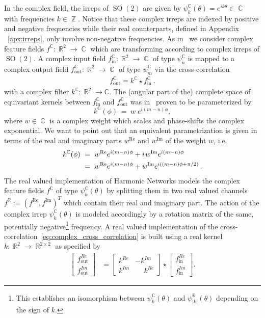 \documentclass{article}
\newcommand{\apx}{Appendix\xspace
}
\DeclareMathOperator*{\R}{\mathbb{R}}
\DeclareMathOperator*{\Cm}{\mathbb{C}}
\DeclareMathOperator*{\Z}{\mathbb{Z}}
\newcommand{\SO}[1]{\ensuremath{\operatorname{SO}(#1)}}
\begin{document}
In the complex field, the irreps of $\SO2$ are given by $\psi^{\Cm}_k(\theta) = e^{ik\theta}\in\Cm$ with frequencies $k\in\Z$.
Notice that these complex irreps are indexed by positive and negative frequencies while their real counterparts, defined in \apx~\ref{apx:irreps}, only involve non-negative frequencies.
As in~\cite{Worrall2017-HNET} we consider complex feature fields $f^\mathbb{C}:\R^2\to\Cm$ which are transforming according to complex irreps of $\SO2$.
A complex input  field $f^\mathbb{C}_\text{in}: \R^2\to\Cm$ of type $\psi^{\mathbb{C}}_n$ is mapped to
a complex output field $f^\mathbb{C}_\text{out}:\R^2\to\Cm$ of type $\psi^{\mathbb{C}}_m$
via the cross-correlation
\begin{align}\label{eq:complex_cross_correlation} 
    f^\mathbb{C}_\text{out} = k^\mathbb{C} \star f^\mathbb{C}_\text{in} \ .
\end{align}
with a complex filter $k^{\mathbb{C}}:\R^2\to\mathbb{C}$.
The (angular part of the) complete space of equivariant kernels between $f^\mathbb{C}_\text{in}$ and $f^\mathbb{C}_\text{out}$ was in~\cite{Worrall2017-HNET} proven to be parameterized by
\[
    k^{\mathbb{C}}(\phi)\ =\ w\; e^{i(m-n)\phi},
\]
where $w\in\Cm$ is a complex weight which scales and phase-shifts the complex exponential.
We want to point out that an equivalent parametrization is given in terms of the real and imaginary parts $w^\text{Re}$ and $w^\text{Im}$ of the weight $w$, i.e.
\begin{align}\label{eq:hnet_basis}
    k^{\mathbb{C}}(\phi)
    \ &=\ w^\text{Re}e^{i(m-n)\phi} + i\;\!w^\text{Im}e^{i (m-n)\phi} \notag \\
    \ &=\ w^\text{Re}e^{i(m-n)\phi} +      w^\text{Im}e^{i((m-n)\phi+\pi/2)}\,.
\end{align}
The real valued implementation of Harmonic Networks models the complex feature fields $f^{\Cm}$ of type $\psi^{\Cm}_k(\theta)$ by splitting them in two real valued channels $f^{\R}:=(f^\text{Re},f^\text{Im})^T$ which contain their real and imaginary part.
The action of the complex irrep $\psi^{\Cm}_k(\theta)$ is modeled accordingly by a rotation matrix of the same, potentially negative\footnote{This establishes an isomorphism between $\psi^{\Cm}_k(\theta)$ and $\psi^{\R}_{|k|}(\theta)$ depending on the sign of $k$.}
frequency.
A real valued implementation of the cross-correlation~\eqref{eq:complex_cross_correlation} is built using a real kernel $k:\R^2\to\R^{2\times2}$ as specified by
\begin{align*}
    \begin{bmatrix}
        f^{Re}_\text{out} \\
        f^{Im}_\text{out}
    \end{bmatrix}
    &= 
    \begin{bmatrix}
        k^{Re} &          -  k^{Im} \\
        k^{Im} & \phantom{-} k^{Re}
    \end{bmatrix} 
    \star
    \begin{bmatrix}
        f^{Re}_\text{in} \\
        f^{Im}_\text{in}
    \end{bmatrix}.
\end{align*}
\end{document}

